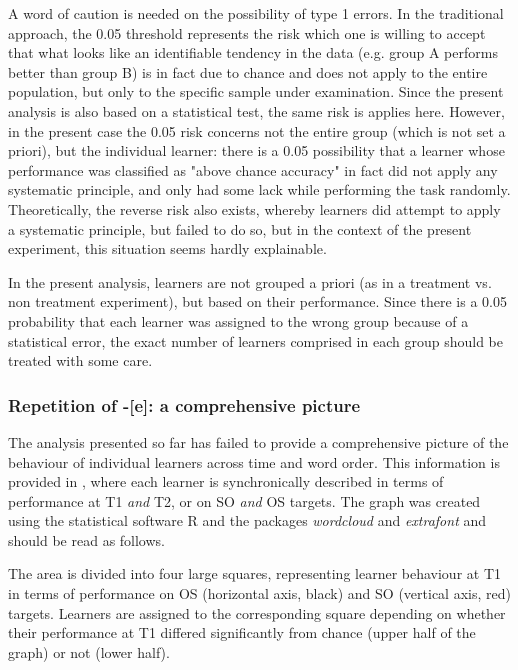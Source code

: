 A word of caution is needed on the possibility of type 1 errors. In the traditional approach, the 0.05 threshold represents the risk which one is willing to accept that what looks like an identifiable tendency in the data (e.g. group A performs better than group B) is in fact due to chance and does not apply to the entire population, but only to the specific sample under examination. Since the present analysis is also based on a statistical test, the same risk is applies here. However, in the present case the 0.05 risk concerns not the entire group (which is not set a priori), but the individual learner: there is a 0.05 possibility that a learner whose performance was classified as "above chance accuracy" in fact did not apply any systematic principle, and only had some lack while performing the task randomly. Theoretically, the reverse risk also exists, whereby learners did attempt to apply a systematic principle, but failed to do so, but in the context of the present experiment, this situation seems hardly explainable. 

In the present analysis, learners are not grouped a priori (as in a treatment vs. non treatment experiment), but based on their performance. Since there is a 0.05 probability that each learner was assigned to the wrong group because of a statistical error, the exact number of learners comprised in each group should be treated with some care.

\subsubsection{Repetition of -[e]: a comprehensive picture}\label{sec:04:2.4.1}

The analysis presented so far has failed to provide a comprehensive picture of the behaviour of individual learners across time and word order. This information is provided in , where each learner is synchronically described in terms of performance at T1 \textit{and} T2, or on SO \textit{and} OS targets. The graph was created using the statistical software R \citep{RCoreTeam2017} and the packages \textit{wordcloud} \citep{Fellows2014} and \textit{extrafont} \citep{Chang2014} and should be read as follows.

The area is divided into four large squares, representing learner behaviour at T1 in terms of performance on OS (horizontal axis, black) and SO (vertical axis, red) targets. Learners are assigned to the corresponding square depending on whether their performance at T1 differed significantly from chance (upper half of the graph) or not (lower half). 

